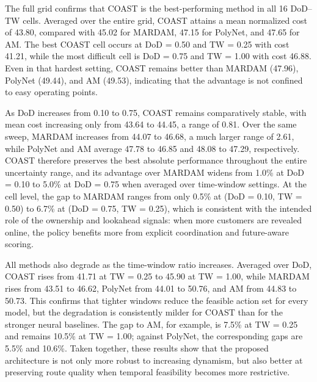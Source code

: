 \documentclass[conference]{IEEEtran}
\begin{document}
The full grid confirms that COAST is the best-performing method in all 16 DoD--TW cells. Averaged over the entire grid, COAST attains a mean normalized cost of 43.80, compared with 45.02 for MARDAM, 47.15 for PolyNet, and 47.65 for AM. The best COAST cell occurs at DoD = 0.50 and TW = 0.25 with cost 41.21, while the most difficult cell is DoD = 0.75 and TW = 1.00 with cost 46.88. Even in that hardest setting, COAST remains better than MARDAM (47.96), PolyNet (49.44), and AM (49.53), indicating that the advantage is not confined to easy operating points.

As DoD increases from 0.10 to 0.75, COAST remains comparatively stable, with mean cost increasing only from 43.64 to 44.45, a range of 0.81. Over the same sweep, MARDAM increases from 44.07 to 46.68, a much larger range of 2.61, while PolyNet and AM average 47.78 to 46.85 and 48.08 to 47.29, respectively. COAST therefore preserves the best absolute performance throughout the entire uncertainty range, and its advantage over MARDAM widens from 1.0\% at DoD = 0.10 to 5.0\% at DoD = 0.75 when averaged over time-window settings. At the cell level, the gap to MARDAM ranges from only 0.5\% at (DoD = 0.10, TW = 0.50) to 6.7\% at (DoD = 0.75, TW = 0.25), which is consistent with the intended role of the ownership and lookahead signals: when more customers are revealed online, the policy benefits more from explicit coordination and future-aware scoring.

All methods also degrade as the time-window ratio increases. Averaged over DoD, COAST rises from 41.71 at TW = 0.25 to 45.90 at TW = 1.00, while MARDAM rises from 43.51 to 46.62, PolyNet from 44.01 to 50.76, and AM from 44.83 to 50.73. This confirms that tighter windows reduce the feasible action set for every model, but the degradation is consistently milder for COAST than for the stronger neural baselines. The gap to AM, for example, is 7.5\% at TW = 0.25 and remains 10.5\% at TW = 1.00; against PolyNet, the corresponding gaps are 5.5\% and 10.6\%. Taken together, these results show that the proposed architecture is not only more robust to increasing dynamism, but also better at preserving route quality when temporal feasibility becomes more restrictive.
\end{document}
